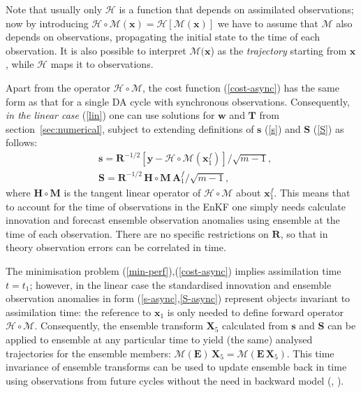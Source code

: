 \documentclass[11pt]{report}
\newcommand{\mb} {\mathbf}
\begin{document}
Note that usually only $\mathcal H$ is a function that depends on assimilated observations; now by introducing $\mathcal H \circ \mathcal M (\mb x) = \mathcal H[\mathcal M(\mb x)]$ we have to assume that $\mathcal M$ also depends on observations, propagating the initial state to the time of each observation.
It is also possible to interpret $\mathcal M(\mb x$) as the \emph{trajectory} starting from $\mb x$, while $\mathcal H$ maps it to observations.

Apart from the operator $\mathcal H \circ \mathcal M$, the cost function (\ref{cost-async}) has the same form as that for a single DA cycle with synchronous observations.
Consequently, \emph{in the linear case} (\ref{lin}) one can use solutions for $\mb w$ and $\mb T$ from section~\ref{sec:numerical}, subject to extending definitions of $\mb s$ (\ref{s}) and $\mb S$ (\ref{S}) as follows:
\begin{align}
  \label{s-async}
  &\mb s = \mb R^{-1/2} \left[ \mb y - \mathcal H \circ \mathcal M (\mb x_1^f) \right] / \sqrt{m - 1},\\
  \label{S-async}
  &\mb S = \mb R^{-1/2} \, \mb H \circ \mb M \, \mb A_1^f / \sqrt{m - 1},
\end{align}
where $\mb H \circ \mb M$ is the tangent linear operator of $\mathcal H \circ \mathcal M$ about $\mb x_1^f$.
This means that to account for the time of observations in the EnKF one simply needs calculate innovation and forecast ensemble observation anomalies using ensemble at the time of each observation.
There are no specific restrictions on $\mb R$, so that in theory observation errors can be correlated in time.

The minimisation problem (\ref{min-perf}),(\ref{cost-async}) implies assimilation time $t = t_1$; however, in the linear case the standardised innovation and ensemble observation anomalies in form (\ref{s-async},\ref{S-async}) represent objects invariant to assimilation time: the reference to $\mb x_1$ is only needed to define forward operator $\mathcal H \circ \mathcal M$.
Consequently, the ensemble transform $\mb X_5$ calculated from $\mb s$ and $\mb S$ can be applied to ensemble at any particular time to yield (the same) analysed trajectories for the ensemble members: $\mathcal M (\mb E) \, \mb X_5 = \mathcal M (\mb E \, \mb X_5)$.
This time invariance of ensemble transforms can be used to update ensemble back in time using observations from future cycles without the need in backward model (\citealt[][sec.~6]{eve00a}, \citealt[][app.~D]{eve03a}).
\end{document}
